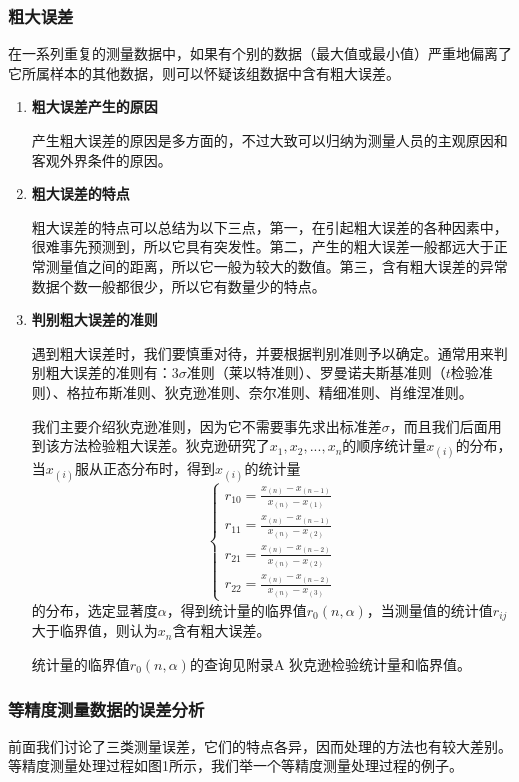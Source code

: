 \subsubsection{粗大误差}
在一系列重复的测量数据中，如果有个别的数据（最大值或最小值）严重地偏离了它所属样本的其他数据，则可以怀疑该组数据中含有粗大误差。
\begin{enumerate}
	\item \textbf{粗大误差产生的原因}
	
	\qquad 产生粗大误差的原因是多方面的，不过大致可以归纳为测量人员的主观原因和客观外界条件的原因。
	\item \textbf{粗大误差的特点}
	
	\qquad 粗大误差的特点可以总结为以下三点，第一，在引起粗大误差的各种因素中，很难事先预测到，所以它具有突发性。第二，产生的粗大误差一般都远大于正常测量值之间的距离，所以它一般为较大的数值。第三，含有粗大误差的异常数据个数一般都很少，所以它有数量少的特点。
	\item \textbf{判别粗大误差的准则}
	
	\qquad 遇到粗大误差时，我们要慎重对待，并要根据判别准则予以确定。通常用来判别粗大误差的准则有：$ 3\sigma $准则（莱以特准则）、罗曼诺夫斯基准则（$ t $检验准则）、格拉布斯准则、狄克逊准则、奈尔准则、精细准则、肖维涅准则。
	
	\qquad 我们主要介绍狄克逊准则，因为它不需要事先求出标准差$ \sigma $，而且我们后面用到该方法检验粗大误差。狄克逊研究了$ x_1,x_2,...,x_n $的顺序统计量$ x_{(i)} $的分布，当$ x_{(i)} $服从正态分布时，得到$ x_{(i)} $的统计量
	\[ \begin{cases}
		r_{10}=\frac{x_{(n)}-x_{(n-1)}}{x_{(n)}-x_{(1)}}\\
		r_{11}=\frac{x_{(n)}-x_{(n-1)}}{x_{(n)}-x_{(2)}}\\
		r_{21}=\frac{x_{(n)}-x_{(n-2)}}{x_{(n)}-x_{(2)}}\\
		r_{22}=\frac{x_{(n)}-x_{(n-2)}}{x_{(n)}-x_{(3)}}
	\end{cases} \]
	的分布，选定显著度$ \alpha $，得到统计量的临界值$ r_0(n,\alpha) $，当测量值的统计值$ r_{ij} $大于临界值，则认为$ x_n $含有粗大误差。
	
	\qquad 统计量的临界值$ r_0(n,\alpha) $的查询见附录A 狄克逊检验统计量和临界值。
\end{enumerate}

\subsubsection{等精度测量数据的误差分析}
前面我们讨论了三类测量误差，它们的特点各异，因而处理的方法也有较大差别。等精度测量处理过程如图1所示，我们举一个等精度测量处理过程的例子。
